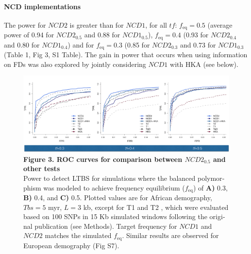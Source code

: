 \begin{refsection}
\begin{otherlanguage}{english}
\paragraph{NCD implementations}
The power for $NCD2$ is greater than for $NCD1$, for all $tf$: $f_{\mathrm{eq}}=0.5$ (average power of 0.94 for $NCD2_{0.5}$ and 0.88 for $NCD1_{0.5}$), $f_{\mathrm{eq}}=0.4$ (0.93 for $NCD2_{0.4}$ and 0.80 for $NCD1_{0.4}$) and for $f_{\mathrm{eq}}=0.3$ (0.85 for $NCD2_{0.3}$ and 0.73 for $NCD1_{0.3}$ (Table 1, Fig 3, S1 Table). The gain in power that occurs when using information on FDs was also explored by jointly considering $NCD1$ with HKA (see below). 


\begin{figure}
\includegraphics[]{chap2_folder/Figures/Fig3.png}
\caption*{\textbf{Figure 3. ROC curves for comparison between $NCD2_{0.5}$ and other tests}\\
Power to detect LTBS for simulations where the balanced polymorphism was modeled to achieve frequency equilibrium ($f_{\mathrm{eq}}$) of \textbf{A)} 0.3, \textbf{B)} 0.4, and \textbf{C)} 0.5. Plotted values are for African demography, $Tbs = 5$ myr, $L = 3$ kb, except for T1 and T2 \parencite{DeGiorgio2014}, which were evaluated based on 100 SNPs in 15 Kb simulated windows following the original publication (see Methods). Target frequency for $NCD1$ and $NCD2$ matches the simulated $f_{\mathrm{eq}}$. Similar results are observed for European demography (Fig S7).}
\end{figure}



\end{otherlanguage}
\end{refsection}
